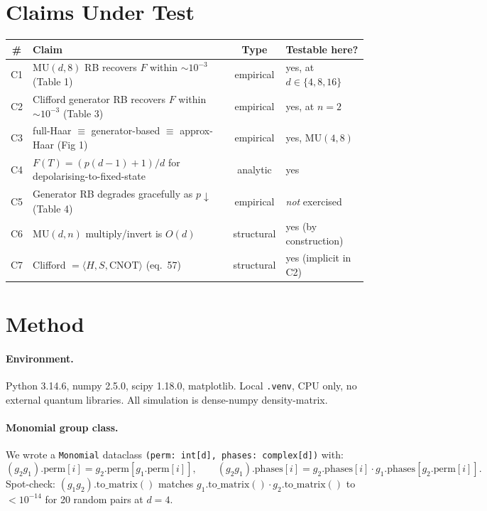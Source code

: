 \documentclass[11pt]{article}
\begin{document}
\section{Claims Under Test}
\begin{center}
\small
\begin{tabular}{clcl}
\toprule
\# & Claim & Type & Testable here? \\
\midrule
C1 & MU$(d,8)$ RB recovers $F$ within $\sim\!10^{-3}$ (Table 1) & empirical & yes, at $d\in\{4,8,16\}$ \\
C2 & Clifford generator RB recovers $F$ within $\sim\!10^{-3}$ (Table 3) & empirical & yes, at $n=2$ \\
C3 & full-Haar $\equiv$ generator-based $\equiv$ approx-Haar (Fig 1) & empirical & yes, $\mathrm{MU}(4,8)$ \\
C4 & $F(T) = (p(d-1)+1)/d$ for depolarising-to-fixed-state & analytic & yes \\
C5 & Generator RB degrades gracefully as $p\downarrow$ (Table 4) & empirical & \emph{not} exercised \\
C6 & MU$(d,n)$ multiply/invert is $O(d)$ & structural & yes (by construction) \\
C7 & Clifford $=\langle H, S, \mathrm{CNOT}\rangle$ (eq.~57) & structural & yes (implicit in C2) \\
\bottomrule
\end{tabular}
\end{center}

\section{Method}

\paragraph{Environment.} Python 3.14.6, numpy 2.5.0, scipy 1.18.0, matplotlib. Local \texttt{.venv}, CPU only, no external quantum libraries. All simulation is dense-numpy density-matrix.

\paragraph{Monomial group class.} We wrote a \texttt{Monomial} dataclass \texttt{(perm: int[d], phases: complex[d])} with:
\[ (g_2 g_1).\text{perm}[i] = g_2.\text{perm}[g_1.\text{perm}[i]],\qquad
   (g_2 g_1).\text{phases}[i] = g_2.\text{phases}[i]\cdot g_1.\text{phases}[g_2.\text{perm}[i]]. \]
Spot-check: $(g_1 g_2).\text{to\_matrix}()$ matches $g_1.\text{to\_matrix}()\cdot g_2.\text{to\_matrix}()$ to $<10^{-14}$ for 20 random pairs at $d=4$.
\end{document}
